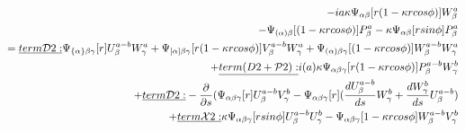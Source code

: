 \documentclass{Note}
\begin{document}
\begin{equation}
\begin{aligned}
-ia\kappa \Psi_{\alpha\beta}[r(1-\kappa rcos\phi)]W_\beta^a\\
-\Psi_{(\alpha)\beta}[(1-\kappa r cos\phi)]P_\beta^a-\kappa \Psi_{\alpha\beta}[r sin\phi]P_\beta^a\\
=
\underline{term \mathcal{D}2:}  \Psi_{\{\alpha\}\beta\gamma} [r]U_\beta^{a-b}W_\gamma^a
+\Psi_{[\alpha]\beta\gamma} [r(1-\kappa rcos\phi)]V_\beta^{a-b}W_\gamma^a
+ \Psi_{(\alpha)\beta\gamma} [(1-\kappa rcos\phi)]W_\beta^{a-b}W_\gamma^a\\
+\underline{term\mathcal({D}2+\mathcal{P}2):}  i(a)\kappa \Psi_{\alpha\beta\gamma}[r(1-\kappa r cos\phi)]P_\beta^{a-b}W_\gamma^{b}\\
+\underline{term \mathcal{D}2:} -{{\partial }\over {\partial s}}(\Psi_{\alpha\beta\gamma}[r]U_\beta^{a-b}V_\gamma^{b}
-\Psi_{\alpha\beta\gamma}[r]({{d U_\beta^{a-b} \over {d s}}W_\gamma^{b}}+{dW_\gamma^{b}\over ds}U_\beta^{a-b})\\
+\underline{term \mathcal{X}2:} \kappa \Psi_{\alpha\beta\gamma}[rsin\phi]U_\beta^{a-b}U_\gamma^b- \Psi_{\alpha\beta\gamma}[1-\kappa r cos\phi]W_\beta^{a-b}V_\gamma^b\\
\end{aligned}
\end{equation}
\end{document}

